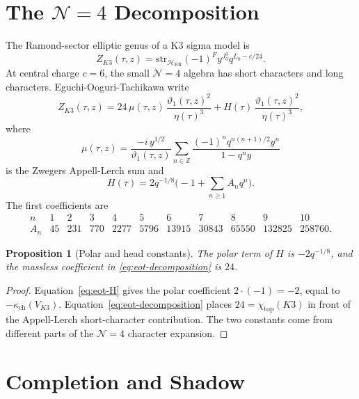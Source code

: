 \documentclass[11pt]{article}
\newtheorem{proposition}[theorem]{Proposition}
\theoremstyle{definition}
\theoremstyle{remark}
\newcommand{\ZZ}{\mathbb{Z}}
\newcommand{\cH}{\mathcal{H}}
\newcommand{\str}{\mathrm{str}}
\begin{document}
\section{The \texorpdfstring{$\mathcal N=4$}{N=4} Decomposition}
\label{sec:n4-decomposition}

The Ramond-sector elliptic genus of a K3 sigma model is
\[
  Z_{K3}(\tau,z)
  =\str_{\cH_{\mathrm{RR}}}
     (-1)^F y^{J_0^3}q^{L_0-c/24}.
\]
At central charge \(c=6\), the small \(\mathcal N=4\) algebra has
short characters and long characters.  Eguchi-Ooguri-Tachikawa write
\begin{equation}
\label{eq:eot-decomposition}
  Z_{K3}(\tau,z)
  =24\,\mu(\tau,z)\,
       \frac{\vartheta_1(\tau,z)^2}{\eta(\tau)^3}
   +H(\tau)\,
       \frac{\vartheta_1(\tau,z)^2}{\eta(\tau)^3},
\end{equation}
where
\[
  \mu(\tau,z)=
  \frac{-i\,y^{1/2}}{\vartheta_1(\tau,z)}
  \sum_{n\in\ZZ}
    \frac{(-1)^n q^{n(n+1)/2}y^n}{1-q^ny}
\]
is the Zwegers Appell-Lerch sum and
\begin{equation}
\label{eq:eot-H}
  H(\tau)=2q^{-1/8}
   \bigl(-1+\sum_{n\geq 1}A_nq^n\bigr).
\end{equation}
The first coefficients are
\[
\begin{array}{c|rrrrrrrrrr}
n&1&2&3&4&5&6&7&8&9&10\\
\hline
A_n&45&231&770&2277&5796&13915&30843&65550&132825&258760.
\end{array}
\]

\begin{proposition}[Polar and head constants]
\label{prop:polar-head}
The polar term of \(H\) is \(-2q^{-1/8}\), and the massless
coefficient in \eqref{eq:eot-decomposition} is \(24\).
\end{proposition}

\begin{proof}
Equation~\eqref{eq:eot-H} gives the polar coefficient
\(2\cdot(-1)=-2\), equal to
\(-\kappa_{\mathrm{ch}}(V_{K3})\).  Equation~\eqref{eq:eot-decomposition}
places \(24=\chi_{\mathrm{top}}(K3)\) in front of the Appell-Lerch
short-character contribution.  The two constants come from different
parts of the \(\mathcal N=4\) character expansion.
\end{proof}

\section{Completion and Shadow}
\label{sec:completion-shadow}
\end{document}

